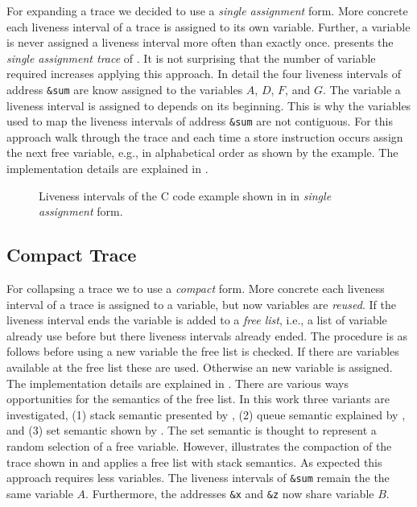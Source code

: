 \documentclass[onecolumn, openright, master, english, signatures]{dbrgrptt}
\begin{document}
For expanding a \ac{trace} we decided to use a \emph{single assignment} form. More concrete each liveness interval of a \ac{trace} is assigned to its own variable. Further, a variable is never assigned a liveness interval more often than exactly once.  presents the \emph{single assignment trace} of . It is not surprising that the number of variable required increases applying this approach. In detail the four liveness intervals of address \texttt{\&sum} are know assigned to the variables $A$, $D$, $F$, and $G$. The variable a liveness interval is assigned to depends on its beginning. This is why the variables used to map the liveness intervals of address \texttt{\&sum} are not contiguous. For this approach walk through the \ac{trace} and each time a store instruction occurs assign the next free variable, e.g., in alphabetical order as shown by the example. The implementation details are explained in .

\begin{figure}[!ht]
  \centering
  
  \caption{Liveness intervals of the C code example shown in  in \emph{single assignment} form.}
  \label{fig:trace-transformation-sa}
\end{figure}

\subsection{Compact Trace}

For collapsing a \ac{trace} we to use a \emph{compact} form. More concrete each liveness interval of a \ac{trace} is assigned to a variable, but now variables are \emph{reused}. If the liveness interval ends the variable is added to a \emph{free list}, i.e., a list of variable already use before but there liveness intervals already ended. The procedure is as follows before using a new variable the free list is checked. If there are variables available at the free list these are used. Otherwise an new variable is assigned. The implementation details are explained in . There are various ways opportunities for the semantics of the free list. In this work three variants are investigated, (1) stack semantic presented by , (2) queue semantic explained by , and (3) set semantic shown by . The set semantic is thought to represent a random selection of a free variable. However,  illustrates the compaction of the \ac{trace} shown in  and applies a free list with stack semantics. As expected this approach requires less variables. The liveness intervals of \texttt{\&sum} remain the the same variable $A$. Furthermore, the addresses \texttt{\&x} and \texttt{\&z} now share variable $B$.
\end{document}

